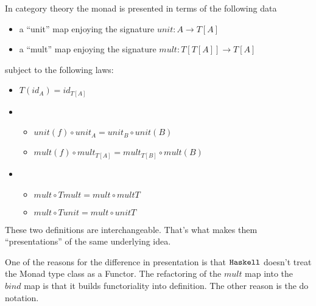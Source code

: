 In category theory the monad is presented in terms of the
following data

\begin{itemize}
  \item a ``unit'' map enjoying the signature $unit : A \to T[A]$
  \item a ``mult'' map enjoying the signature $mult : T[T[A]] \to T[A]$
\end{itemize}

subject to the following laws:

\begin{itemize}
  \item $T( id_A ) = id_{T[A]}$ %
  \item %
    \begin{itemize}
    \item $unit(f) \circ unit_{A} = unit_{B} \circ unit(B)$ %
    \item $mult(f) \circ mult_{T[A]} = mult_{T[B]} \circ mult(B)$ %
    \end{itemize}
  \item %
    \begin{itemize}
    \item $mult \circ T mult = mult \circ mult T$ %
    \item $mult \circ T unit = mult \circ unit T$ %
    \end{itemize}
\end{itemize}

These two definitions are interchangeable. That's what makes them
``presentations'' of the same underlying idea.

One of the reasons for the difference in presentation is that $\texttt{Haskell}$
doesn't treat the Monad type class as a Functor. The refactoring of
the $mult$ map into the $bind$ map is that it builds functoriality
into definition. The other reason is the do notation.





